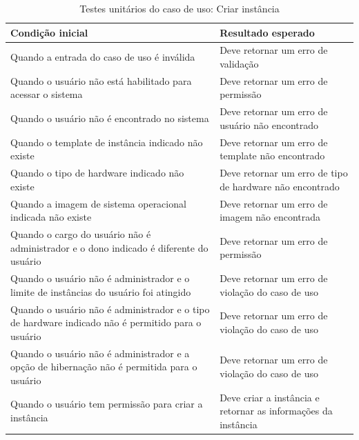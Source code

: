 \begin{table}[h]
\caption{Testes unitários do caso de uso: Criar instância}
\label{tab:testeCriarInstancia}
\begin{tabularx}{\textwidth}{p{} p{}}
\toprule
\textbf{Condição inicial} & \textbf{Resultado esperado} \\ \midrule

Quando a entrada do caso de uso é inválida & Deve retornar um erro de validação \\ \hline

Quando o usuário não está habilitado para acessar o sistema & Deve retornar um erro de permissão \\ \hline

Quando o usuário não é encontrado no sistema & Deve retornar um erro de usuário não encontrado \\ \hline

Quando o template de instância indicado não existe & Deve retornar um erro de template não encontrado \\ \hline

Quando o tipo de hardware indicado não existe & Deve retornar um erro de tipo de hardware não encontrado \\ \hline

Quando a imagem de sistema operacional indicada não existe & Deve retornar um erro de imagem não encontrada \\ \hline

Quando o cargo do usuário não é administrador e o dono indicado é diferente do usuário & Deve retornar um erro de permissão \\ \hline

Quando o usuário não é administrador e o limite de instâncias do usuário foi atingido & Deve retornar um erro de violação do caso de uso \\ \hline

Quando o usuário não é administrador e o tipo de hardware indicado não é permitido para o usuário & Deve retornar um erro de violação do caso de uso \\ \hline

Quando o usuário não é administrador e a opção de hibernação não é permitida para o usuário & Deve retornar um erro de violação do caso de uso \\ \hline

Quando o usuário tem permissão para criar a instância & Deve criar a instância e retornar as informações da instância \\

\bottomrule
\end{tabularx}
\end{table}

